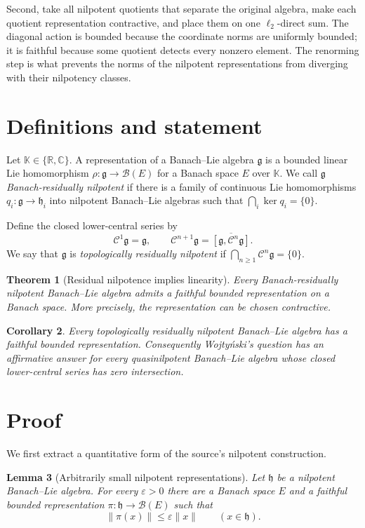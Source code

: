 \documentclass[11pt]{article}
\newtheorem{theorem}{Theorem}
\newtheorem{lemma}[theorem]{Lemma}
\newtheorem{corollary}[theorem]{Corollary}
\theoremstyle{definition}
\theoremstyle{remark}
\newcommand{\K}{\mathbb K}
\newcommand{\B}{\mathcal B}
\newcommand{\g}{\mathfrak g}
\newcommand{\h}{\mathfrak h}
\newcommand{\Cen}{\mathcal C}
\newcommand{\norm}[1]{\lVert #1\rVert}
\begin{document}
Second, take all nilpotent quotients that separate the original algebra,
make each quotient representation contractive, and place them on one
$\ell_2$-direct sum. The diagonal action is bounded because the coordinate
norms are uniformly bounded; it is faithful because some quotient detects
every nonzero element. The renorming step is what prevents the norms of the
nilpotent representations from diverging with their nilpotency classes.

\section{Definitions and statement}

Let $\K\in\{\mathbb R,\mathbb C\}$. A representation of a Banach--Lie
algebra $\g$ is a bounded linear Lie homomorphism
$\rho:\g\to\B(E)$ for a Banach space $E$ over $\K$. We call $\g$
\emph{Banach-residually nilpotent} if there is a family of continuous Lie
homomorphisms $q_i:\g\to\h_i$ into nilpotent Banach--Lie algebras such that
$\bigcap_i\ker q_i=\{0\}$.

Define the closed lower-central series by
\[
 \Cen^1\g=\g,\qquad
 \Cen^{n+1}\g=\overline{[\g,\Cen^n\g]}.
\]
We say that $\g$ is \emph{topologically residually nilpotent} if
$\bigcap_{n\ge1}\Cen^n\g=\{0\}$.

\begin{theorem}[Residual nilpotence implies linearity]\label{thm:main}
Every Banach-residually nilpotent Banach--Lie algebra admits a faithful
bounded representation on a Banach space. More precisely, the representation
can be chosen contractive.
\end{theorem}

\begin{corollary}\label{cor:lower}
Every topologically residually nilpotent Banach--Lie algebra has a faithful
bounded representation. Consequently Wojty\'nski's question has an
affirmative answer for every quasinilpotent Banach--Lie algebra whose closed
lower-central series has zero intersection.
\end{corollary}

\section{Proof}

We first extract a quantitative form of the source's nilpotent construction.

\begin{lemma}[Arbitrarily small nilpotent representations]\label{lem:small}
Let $\h$ be a nilpotent Banach--Lie algebra. For every $\varepsilon>0$ there
are a Banach space $E$ and a faithful bounded representation
$\pi:\h\to\B(E)$ such that
\[
 \norm{\pi(x)}\le \varepsilon\norm{x}\qquad(x\in\h).
\]
\end{lemma}
\end{document}
